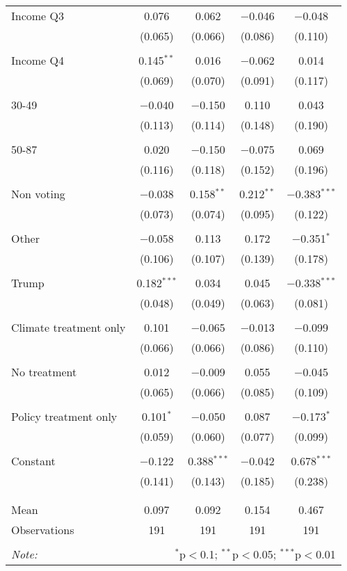\begin{tabular}{@{\extracolsep{5pt}}lcccc}
 Income Q3 & 0.076 & 0.062 & $-$0.046 & $-$0.048 \\ 
  & (0.065) & (0.066) & (0.086) & (0.110) \\ 
  & & & & \\ 
 Income Q4 & 0.145$^{**}$ & 0.016 & $-$0.062 & 0.014 \\ 
  & (0.069) & (0.070) & (0.091) & (0.117) \\ 
  & & & & \\ 
 30-49 & $-$0.040 & $-$0.150 & 0.110 & 0.043 \\ 
  & (0.113) & (0.114) & (0.148) & (0.190) \\ 
  & & & & \\ 
 50-87 & 0.020 & $-$0.150 & $-$0.075 & 0.069 \\ 
  & (0.116) & (0.118) & (0.152) & (0.196) \\ 
  & & & & \\ 
 Non voting & $-$0.038 & 0.158$^{**}$ & 0.212$^{**}$ & $-$0.383$^{***}$ \\ 
  & (0.073) & (0.074) & (0.095) & (0.122) \\ 
  & & & & \\ 
 Other & $-$0.058 & 0.113 & 0.172 & $-$0.351$^{*}$ \\ 
  & (0.106) & (0.107) & (0.139) & (0.178) \\ 
  & & & & \\ 
 Trump & 0.182$^{***}$ & 0.034 & 0.045 & $-$0.338$^{***}$ \\ 
  & (0.048) & (0.049) & (0.063) & (0.081) \\ 
  & & & & \\ 
 Climate treatment only & 0.101 & $-$0.065 & $-$0.013 & $-$0.099 \\ 
  & (0.066) & (0.066) & (0.086) & (0.110) \\ 
  & & & & \\ 
 No treatment & 0.012 & $-$0.009 & 0.055 & $-$0.045 \\ 
  & (0.065) & (0.066) & (0.085) & (0.109) \\ 
  & & & & \\ 
 Policy treatment only & 0.101$^{*}$ & $-$0.050 & 0.087 & $-$0.173$^{*}$ \\ 
  & (0.059) & (0.060) & (0.077) & (0.099) \\ 
  & & & & \\ 
 Constant & $-$0.122 & 0.388$^{***}$ & $-$0.042 & 0.678$^{***}$ \\ 
  & (0.141) & (0.143) & (0.185) & (0.238) \\ 
  & & & & \\ 
\hline \\[-1.8ex] 
Mean & 0.097 & 0.092 & 0.154 & 0.467 \\ 
Observations & 191 & 191 & 191 & 191 \\ 
\hline 
\hline \\[-1.8ex] 
\textit{Note:}  & \multicolumn{4}{r}{$^{*}$p$<$0.1; $^{**}$p$<$0.05; $^{***}$p$<$0.01} \\ 
\end{tabular} 
